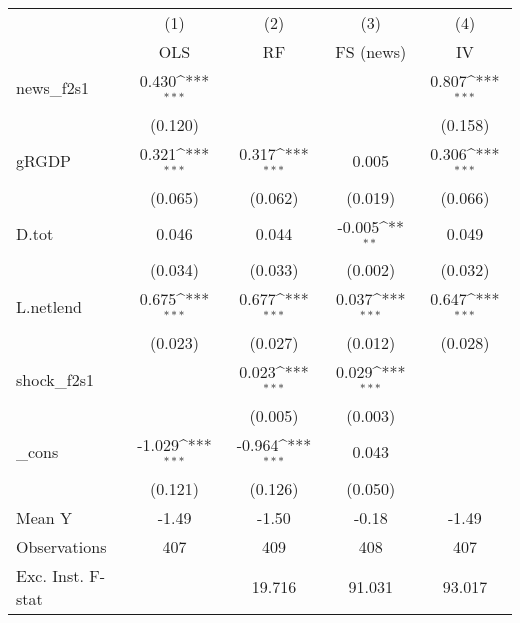 {
\def\sym#1{\ifmmode^{#1}\else\(^{#1}\)\fi}
\begin{tabular}{l*{4}{c}}
\toprule
            &\multicolumn{1}{c}{(1)}&\multicolumn{1}{c}{(2)}&\multicolumn{1}{c}{(3)}&\multicolumn{1}{c}{(4)}\\
            &\multicolumn{1}{c}{OLS}&\multicolumn{1}{c}{RF}&\multicolumn{1}{c}{FS (news)}&\multicolumn{1}{c}{IV}\\
\midrule
news\_f2s1   &       0.430\sym{***}&                     &                     &       0.807\sym{***}\\
            &     (0.120)         &                     &                     &     (0.158)         \\
\addlinespace
gRGDP       &       0.321\sym{***}&       0.317\sym{***}&       0.005         &       0.306\sym{***}\\
            &     (0.065)         &     (0.062)         &     (0.019)         &     (0.066)         \\
\addlinespace
D.tot       &       0.046         &       0.044         &      -0.005\sym{**} &       0.049         \\
            &     (0.034)         &     (0.033)         &     (0.002)         &     (0.032)         \\
\addlinespace
L.netlend   &       0.675\sym{***}&       0.677\sym{***}&       0.037\sym{***}&       0.647\sym{***}\\
            &     (0.023)         &     (0.027)         &     (0.012)         &     (0.028)         \\
\addlinespace
shock\_f2s1  &                     &       0.023\sym{***}&       0.029\sym{***}&                     \\
            &                     &     (0.005)         &     (0.003)         &                     \\
\addlinespace
\_cons      &      -1.029\sym{***}&      -0.964\sym{***}&       0.043         &                     \\
            &     (0.121)         &     (0.126)         &     (0.050)         &                     \\
\midrule
Mean Y      &       -1.49         &       -1.50         &       -0.18         &       -1.49         \\
Observations&         407         &         409         &         408         &         407         \\
Exc. Inst. F-stat&                     &      19.716         &      91.031         &      93.017         \\
\bottomrule
\end{tabular}
}
